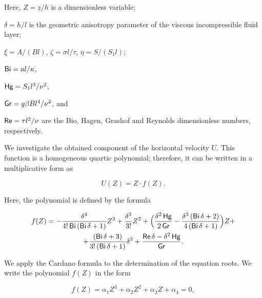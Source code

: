 Here, $Z= {z}/{h}$ is a dimensionless variable; 

$\delta={h}/{l}$ is the geometric anisotropy parameter of the viscous incompressible fluid layer; 

$\xi={A}/({Bl})$, $\zeta={\sigma l}/{\tau}$, $\eta= {S}/({S_1l})$; 

$\mathop{\sf Bi}={al}/{\kappa}$, 

$\mathop{\sf Hg}={S_1l^3}/{\nu^2}$, 

$\mathop{\sf Gr}={g\beta Bl^4}/{\nu^2}$, and 

$\mathop{\sf Re}={\tau l^2}/{\nu}$ are the Bio, Hagen, Grashof and Reynolds dimensionless numbers, respectively.



\smallskip




We investigate the obtained component of the horizontal velocity $U$. This function is a homogeneous quartic polynomial; therefore, it can be written in a multiplicative form as

$$

U(Z)=Z \cdot f(Z).

$$

Here, the polynomial   is defined by the formula

\begin{multline}

f(Z)= 

-\frac{\delta^4}{4!\mathop{\sf Bi}\left(\mathop{\sf Bi}\delta+1\right)} Z^3+\frac{\delta^3}{3!} Z^2+

\Bigl(\frac{\delta^2 \mathop{\sf Hg}}{2\mathop{\sf Gr}}- \frac{\delta^3 \left(\mathop{\sf Bi}\delta+2\right)}{4\left(\mathop{\sf Bi}\delta+1\right)}\Bigr)Z+

\\

+\frac{\left(\mathop{\sf Bi}\delta+3\right)}{3!\left(\mathop{\sf Bi}\delta+1\right)}\delta^3+\frac{\mathop{\sf Re} \delta - \delta^2 \mathop{\sf Hg}}{\mathop{\sf Gr}}.

\end{multline}

We apply the Cardano formula to the determination of the equation roots. We write the polynomial $f(Z)$ in the form

\begin{equation}

       \label{eq:VVP_EYP:fZ}

f(Z)= \alpha_1 Z^3 +\alpha_2 Z^2 + \alpha_3 Z + \alpha_4=0,

 \end{equation}

